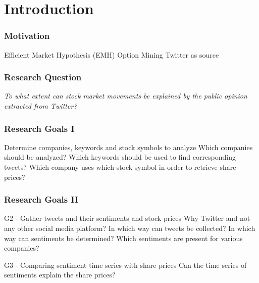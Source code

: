 
\section{Introduction}
 
\begin{frame}
    \frametitle{Motivation}
    
    \begin{outline}
        \1 Efficient Market Hypothesis (EMH)
        \1 Option Mining
        \1 Twitter as source
    \end{outline}
\end{frame}


\begin{frame}
    \frametitle{Research Question}

    \emph{
    To what extent can stock market movements be explained by the public opinion extracted from Twitter?
    }
\end{frame}

\begin{frame}
    \frametitle{Research Goals I}
    
    \begin{outline}
        \1 Determine companies, keywords and stock symbols to analyze
            \2 Which companies should be analyzed?
            \2 Which keywords should be used to find corresponding tweets?
            \2 Which company uses which stock symbol in order to retrieve share prices?
    \end{outline}
\end{frame}

\begin{frame}
    \frametitle{Research Goals II}

    \begin{outline}

    \1 G2 - Gather tweets and their sentiments and stock prices
        \2 Why Twitter and not any other social media platform?
        \2 In which way can tweets be collected?
        \2 In which way can sentiments be determined?
        \2 Which sentiments are present for various companies?

    \1 G3 - Comparing sentiment time series with share prices
        \2 Can the time series of sentiments explain the share prices?

    \end{outline}
\end{frame}
